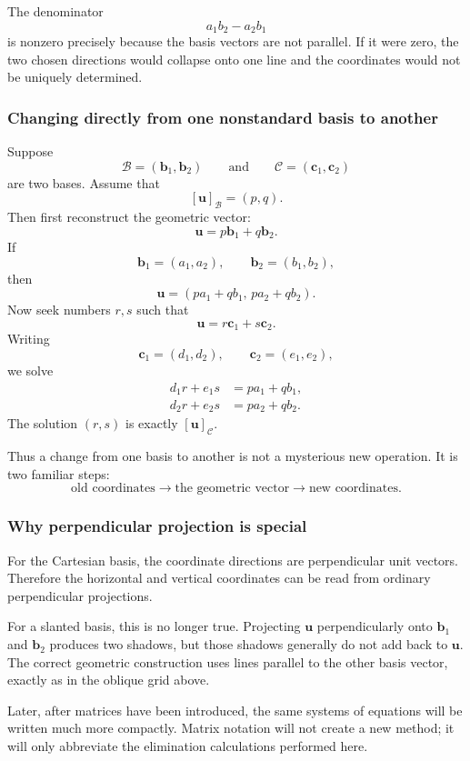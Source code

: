 The denominator
\[
a_1b_2-a_2b_1
\]
is nonzero precisely because the basis vectors are not parallel. If it were
zero, the two chosen directions would collapse onto one line and the
coordinates would not be uniquely determined.

\subsubsection*{Changing directly from one nonstandard basis to another}

Suppose
\[
\mathcal B=(\mathbf b_1,\mathbf b_2)
\qquad\text{and}\qquad
\mathcal C=(\mathbf c_1,\mathbf c_2)
\]
are two bases. Assume that
\[
[\mathbf u]_{\mathcal B}=(p,q).
\]
Then first reconstruct the geometric vector:
\[
\mathbf u=p\mathbf b_1+q\mathbf b_2.
\]
If
\[
\mathbf b_1=(a_1,a_2),
\qquad
\mathbf b_2=(b_1,b_2),
\]
then
\[
\mathbf u=(pa_1+qb_1,\,pa_2+qb_2).
\]
Now seek numbers $r,s$ such that
\[
\mathbf u=r\mathbf c_1+s\mathbf c_2.
\]
Writing
\[
\mathbf c_1=(d_1,d_2),
\qquad
\mathbf c_2=(e_1,e_2),
\]
we solve
\[
\begin{aligned}
 d_1r+e_1s&=pa_1+qb_1,\\
 d_2r+e_2s&=pa_2+qb_2.
\end{aligned}
\]
The solution $(r,s)$ is exactly $[\mathbf u]_{\mathcal C}$.

Thus a change from one basis to another is not a mysterious new operation. It
is two familiar steps:
\[
\boxed{
\text{old coordinates}
\longrightarrow
\text{the geometric vector}
\longrightarrow
\text{new coordinates}.}
\]

\subsubsection*{Why perpendicular projection is special}

For the Cartesian basis, the coordinate directions are perpendicular unit
vectors. Therefore the horizontal and vertical coordinates can be read from
ordinary perpendicular projections.

For a slanted basis, this is no longer true. Projecting $\mathbf u$
perpendicularly onto $\mathbf b_1$ and $\mathbf b_2$ produces two shadows, but
those shadows generally do not add back to $\mathbf u$. The correct geometric
construction uses lines parallel to the other basis vector, exactly as in the
oblique grid above.

\begin{remarkbox}
Later, after matrices have been introduced, the same systems of equations will
be written much more compactly. Matrix notation will not create a new method;
it will only abbreviate the elimination calculations performed here.
\end{remarkbox}

